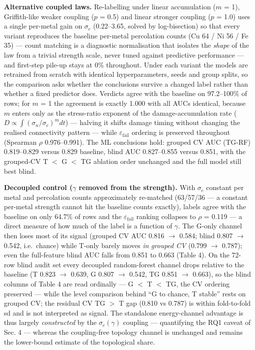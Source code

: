 \documentclass[11pt]{article}
\begin{document}
\textbf{Alternative coupled laws.} Re-labelling under linear accumulation ($m$ = 1), Griffith-like weaker coupling ($p$ = 0.5) and linear stronger coupling ($p$ = 1.0) uses a single per-metal gain on $\sigma_{c}$ (0.22--3.65, solved by log-bisection) so that every variant reproduces the baseline per-metal percolation counts (Cu 64 / Ni 56 / Fe 35) --- count matching is a diagnostic normalisation that isolates the \textit{shape} of the law from a trivial strength scale, never tuned against predictive performance --- and first-step pile-up stays at 0\% throughout. Under each variant the models are retrained from scratch with identical hyperparameters, seeds and group splits, so the comparison asks whether the conclusions survive a changed label rather than whether a fixed predictor does. Verdicts agree with the baseline on 97.2--100\% of rows; for $m$ = 1 the agreement is exactly 1.000 with all AUCs identical, because $m$ enters only as the stress-ratio exponent of the damage-accumulation rate ($D \propto \int (\sigma_{n}/\sigma_{c})^{m} dt$) --- halving it shifts damage timing without changing the realised connectivity pattern --- while $\varepsilon_{\mathrm{fail}}$ ordering is preserved throughout (Spearman $\rho$ 0.976--0.991). The ML conclusions hold: grouped CV AUC (TG-RF) 0.819--0.829 versus 0.829 baseline, blind AUC 0.827--0.855 versus 0.851, with the grouped-CV T $<$ G $<$ TG ablation order unchanged and the full model still best blind.

\textbf{Decoupled control ($\gamma$ removed from the strength).} With $\sigma_{c}$ constant per metal and percolation counts approximately re-matched (63/57/36 --- a constant per-metal strength cannot hit the baseline counts exactly), labels agree with the baseline on only 64.7\% of rows and the $\varepsilon_{\mathrm{fail}}$ ranking collapses to $\rho$ = 0.119 --- a direct measure of how much of the label is a function of $\gamma$. The G-only channel then loses most of its signal (grouped CV AUC 0.816 $\rightarrow$ 0.584; blind 0.807 $\rightarrow$ 0.542, i.e.\ chance) while T-only barely moves \textit{in grouped CV} (0.799 $\rightarrow$ 0.787); even the full-feature blind AUC falls from 0.851 to 0.663 (Table 4). On the 72-row blind audit set every decoupled random-forest channel drops relative to the baseline (T 0.823 $\rightarrow$ 0.639, G 0.807 $\rightarrow$ 0.542, TG 0.851 $\rightarrow$ 0.663), so the blind columns of Table 4 are read ordinally --- G $<$ T $<$ TG, the CV ordering preserved --- while the level comparison behind ``G to chance, T stable'' rests on grouped CV; the residual CV TG $>$ T gap (0.810 vs 0.787) is within fold-to-fold sd and is not interpreted as signal. The standalone energy-channel advantage is thus largely \textit{constructed} by the $\sigma_{c}(\gamma)$ coupling --- quantifying the RQ1 caveat of Sec. 4 --- whereas the coupling-free topology channel is unchanged and remains the lower-bound estimate of the topological share.
\end{document}
